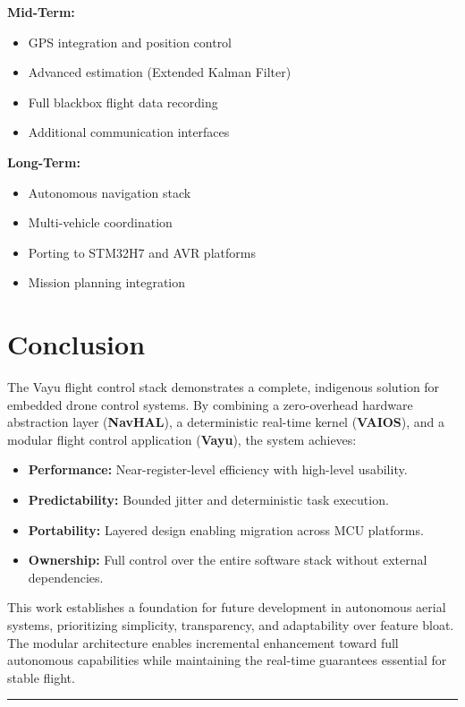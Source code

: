 \documentclass[11pt]{article}
\newcommand{\vayuname}{\textbf{Vayu}}
\newcommand{\navhal}{\textbf{NavHAL}}
\newcommand{\vaios}{\textbf{VAIOS}}
\begin{document}
\textbf{Mid-Term:}
\begin{itemize}[leftmargin=*]
    \item GPS integration and position control
    \item Advanced estimation (Extended Kalman Filter)
    \item Full blackbox flight data recording
    \item Additional communication interfaces
\end{itemize}

\textbf{Long-Term:}
\begin{itemize}[leftmargin=*]
    \item Autonomous navigation stack
    \item Multi-vehicle coordination
    \item Porting to STM32H7 and AVR platforms
    \item Mission planning integration
\end{itemize}

\section{Conclusion}

The Vayu flight control stack demonstrates a complete, indigenous solution for embedded drone control systems. By combining a zero-overhead hardware abstraction layer (\navhal), a deterministic real-time kernel (\vaios), and a modular flight control application (\vayuname), the system achieves:

\begin{itemize}[leftmargin=*]
    \item \textbf{Performance:} Near-register-level efficiency with high-level usability.
    \item \textbf{Predictability:} Bounded jitter and deterministic task execution.
    \item \textbf{Portability:} Layered design enabling migration across MCU platforms.
    \item \textbf{Ownership:} Full control over the entire software stack without external dependencies.
\end{itemize}

This work establishes a foundation for future development in autonomous aerial systems, prioritizing simplicity, transparency, and adaptability over feature bloat. The modular architecture enables incremental enhancement toward full autonomous capabilities while maintaining the real-time guarantees essential for stable flight.

\vspace{0.5cm}
\begin{center}
\rule{0.5\textwidth}{0.4pt}
\end{center}
\end{document}
